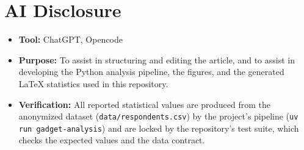 \section*{AI Disclosure}

\begin{itemize}
  \item \textbf{Tool:} ChatGPT, Opencode
  \item \textbf{Purpose:} To assist in structuring and editing the article,
  and to assist in developing the Python analysis pipeline, the figures,
  and the generated LaTeX statistics used in this repository.
  \item \textbf{Verification:} All reported statistical values are produced
  from the anonymized dataset (\texttt{data/respondents.csv}) by the
  project's pipeline (\texttt{uv run gadget-analysis}) and are locked by
  the repository's test suite, which checks the expected values and the
  data contract.
\end{itemize}
